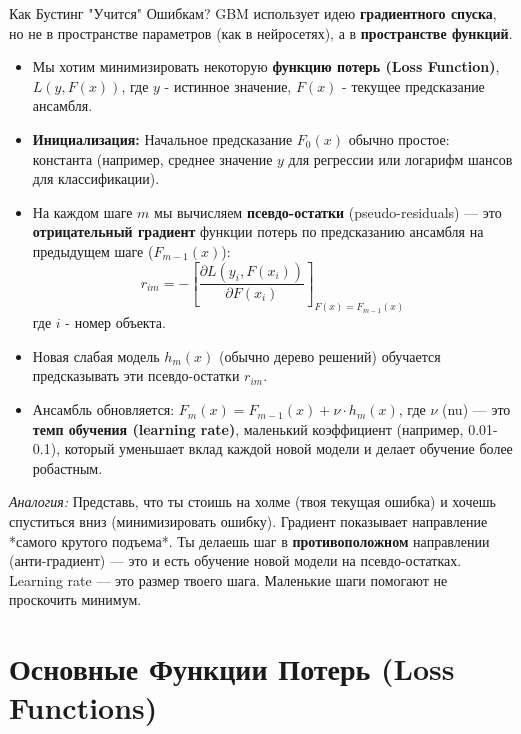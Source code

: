 \begin{myblock}{Как Бустинг "Учится" Ошибкам?}
    GBM использует идею \textbf{градиентного спуска}, но не в пространстве параметров (как в нейросетях), а в \textbf{пространстве функций}.
    \begin{itemize}
        \item Мы хотим минимизировать некоторую \textbf{функцию потерь (Loss Function)}, $L(y, F(x))$, где $y$ - истинное значение, $F(x)$ - текущее предсказание ансамбля.
        \item \textbf{Инициализация:} Начальное предсказание $F_0(x)$ обычно простое: константа (например, среднее значение $y$ для регрессии или логарифм шансов для классификации). %
        \item На каждом шаге $m$ мы вычисляем \textbf{псевдо-остатки} (pseudo-residuals) — это \textbf{отрицательный градиент} функции потерь по предсказанию ансамбля на предыдущем шаге ($F_{m-1}(x)$):
          \[ r_{im} = - \left[ \frac{\partial L(y_i, F(x_i))}{\partial F(x_i)} \right]_{F(x) = F_{m-1}(x)} \]
          где $i$ - номер объекта.
        \item Новая слабая модель $h_m(x)$ (обычно дерево решений) обучается предсказывать эти псевдо-остатки $r_{im}$.
        \item Ансамбль обновляется: $F_m(x) = F_{m-1}(x) + \nu \cdot h_m(x)$, где $\nu$ (nu) — это \textbf{темп обучения (learning rate)}, маленький коэффициент (например, 0.01-0.1), который уменьшает вклад каждой новой модели и делает обучение более робастным.
    \end{itemize}
    \textit{Аналогия:} Представь, что ты стоишь на холме (твоя текущая ошибка) и хочешь спуститься вниз (минимизировать ошибку). Градиент показывает направление *самого крутого подъема*. Ты делаешь шаг в \textbf{противоположном} направлении (анти-градиент) — это и есть обучение новой модели на псевдо-остатках. Learning rate — это размер твоего шага. Маленькие шаги помогают не проскочить минимум.
\end{myblock}

\section{Основные Функции Потерь (Loss Functions)}

